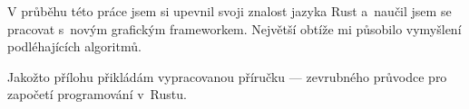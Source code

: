 \documentclass[a4paper, 12pt, twoside]{article} %
\begin{document}
	V průběhu této práce jsem si upevnil svoji znalost jazyka Rust a~naučil jsem se pracovat s~novým grafickým frameworkem. Největší obtíže mi působilo vymyšlení podléhajících algoritmů.
	
	Jakožto přílohu přikládám vypracovanou příručku — zevrubného průvodce pro započetí programování v~Rustu.



\end{document}

